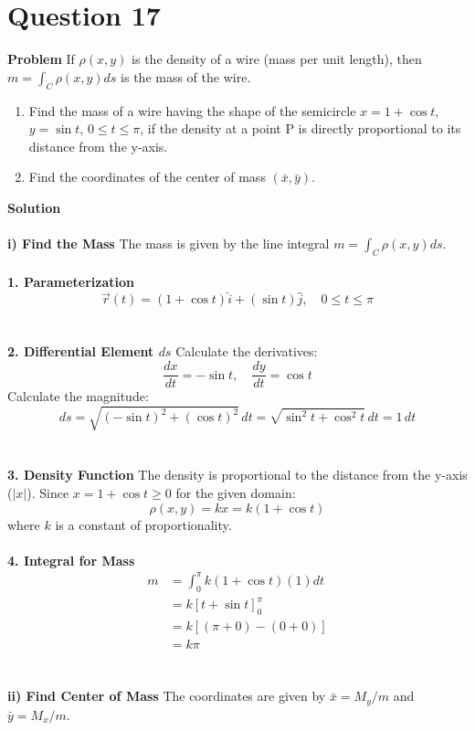 \documentclass{article}
\begin{document}
\section{Question 17}
\label{sec:q17}
\textbf{Problem}
If $\rho(x,y)$ is the density of a wire (mass per unit length), then
$m = \int_{C}{\rho(x,y)ds}$ is the mass of the wire.
\begin{enumerate}
	\item[i)] Find the mass of a wire having the shape of the semicircle $x=1+\cos t$, $y=\sin t$, $0 \le t \le \pi$, if the density at a point P is directly proportional to its distance from the y-axis.
	\item[ii)] Find the coordinates of the center of mass $(\bar{x}, \bar{y})$.
\end{enumerate}
\textbf{Solution}
\\
\\
\textbf{i) Find the Mass}
The mass is given by the line integral $m = \int_{C}{\rho(x,y)ds}$.
\\
\\
\textbf{1. Parameterization}
\[
	\vec{r}(t) = (1 + \cos{t})\hat{i} + (\sin{t})\hat{j}, \quad 0 \le t \le \pi
\]
\\
\\
\textbf{2. Differential Element $ds$}
Calculate the derivatives:
\[
	\frac{dx}{dt} = -\sin{t}, \quad \frac{dy}{dt} = \cos{t}
\]
Calculate the magnitude:
\[
	ds = \sqrt{\left(-\sin{t}\right)^{2} + \left(\cos{t}\right)^{2}} \, dt = \sqrt{\sin^{2}{t} + \cos^{2}{t}} \, dt = 1 \, dt
\]
\\
\\
\textbf{3. Density Function}
The density is proportional to the distance from the y-axis ($|x|$). Since $x = 1 + \cos{t} \ge 0$ for the given domain:
\[
	\rho(x,y) = kx = k(1 + \cos{t})
\]
where $k$ is a constant of proportionality.
\\
\\
\textbf{4. Integral for Mass}
\begin{align*}
	m & = \int_{0}^{\pi}{k(1 + \cos t)(1)dt}    \\
	  & = k \left[ t + \sin t \right]_{0}^{\pi} \\
	  & = k [(\pi + 0) - (0 + 0)]               \\
	  & = k\pi
\end{align*}
\\
\\
\textbf{ii) Find Center of Mass}
The coordinates are given by $\bar{x} = M_{y}/m$ and
$\bar{y} = M_{x}/m$.
\\
\end{document}
